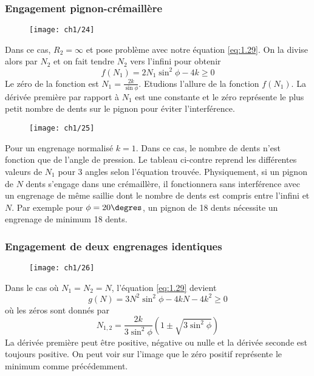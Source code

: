 	\subsubsection{Engagement pignon-crémaillère}
		\begin{wrapfigure}[8]{l}{4cm}
		\vspace{-5mm}
		\texttt{[image: ch1/24]}
		\end{wrapfigure}				 
		Dans ce cas, $R_2= \infty$ et pose problème avec notre équation \autoref{eq:1.29}. On la divise alors par $N_2$ et on fait tendre $N_2$ vers l'infini pour obtenir
		\begin{equation}
			f(N_1) = 2N_1\sin ^2\phi - 4k \geq 0 
		\end{equation}
		Le zéro de la fonction est $N_1 = \frac{2k}{\sin \phi}$. Etudions l'allure de la fonction $f(N_1)$. La dérivée première par rapport à $N_1$ est une constante et le zéro représente le plus petit nombre de dents sur le pignon pour éviter l'interférence. \\

		\begin{wrapfigure}[3]{r}{3.7cm}
		\vspace{-5mm}
		\texttt{[image: ch1/25]}
		\end{wrapfigure}		
		Pour un engrenage normalisé $k = 1$. Dans ce cas, le nombre de dents n'est fonction que de l'angle de pression. Le tableau ci-contre reprend les différentes valeurs de $N_1$ pour 3 angles selon l'équation trouvée. Physiquement, si un pignon de $N$ dents s'engage dans une crémaillère, il fonctionnera sans interférence avec un engrenage de même saillie dont le nombre de dents est compris entre l'infini et $N$. Par exemple pour $\phi = 20\degres$, un pignon de 18 dents nécessite un engrenage de minimum 18 dents. 
		
	\subsubsection{Engagement de deux engrenages identiques}
		\begin{wrapfigure}[8]{l}{4cm}
		\vspace{-5mm}
		\texttt{[image: ch1/26]}
		\end{wrapfigure}				
		Dans le cas où $N_1=N_2=N$, l'équation \autoref{eq:1.29} devient 
		\begin{equation}
			g(N) = 3N^2\sin ^2 \phi - 4kN - 4k^2 \geq 0
		\end{equation}
		où les zéros sont donnés par 
		\begin{equation}
			N_{1,2} = \frac{2k}{3\sin ^2 \phi} (1 \pm \sqrt{3 \sin ^2 \phi})
		\end{equation}
		La dérivée première peut être positive, négative ou nulle et la dérivée seconde est toujours positive. On peut voir sur l'image que le zéro positif représente le minimum comme précédemment. 

